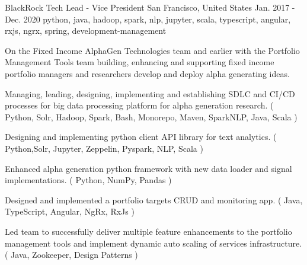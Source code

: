 \cventry
    {BlackRock} %
    {Tech Lead - Vice President} %
    {San Francisco, United States} %
    {Jan. 2017 - Dec. 2020} %
    { python, java, hadoop, spark, nlp, jupyter, scala, typescript, angular, rxjs, ngrx, spring, development-management} %
    {
        On the Fixed Income AlphaGen Technologies team and earlier with the Portfolio Management Tools team building, enhancing and supporting fixed income portfolio managers and researchers develop and deploy alpha generating ideas.
    \begin{cvitems} %
        \item { Managing, leading, designing, implementing and establishing SDLC and CI/CD processes for big data processing platform for alpha generation research. ( Python, Solr, Hadoop, Spark, Bash, Monorepo, Maven, SparkNLP, Java, Scala ) }
        \item { Designing and implementing python client API library for text analytics. ( Python,Solr, Jupyter, Zeppelin, Pyspark, NLP, Scala )}
        \item { Enhanced alpha generation python framework with new data loader and signal implementations. ( Python, NumPy, Pandas )}
        \item { Designed and implemented a portfolio targets CRUD and monitoring app. ( Java, TypeScript, Angular, NgRx, RxJs ) }
        \item { Led team to successfully deliver multiple feature enhancements to the portfolio management tools and implement dynamic auto scaling of services infrastructure. ( Java, Zookeeper, Design Patterns )}
    \end{cvitems}
    }





